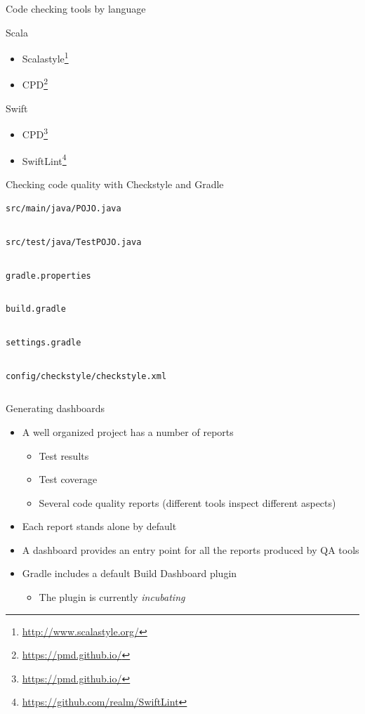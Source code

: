 \documentclass[presentation]{beamer}
\newcommand{\codefile}[4]{
	\begin{block}{\texttt{#2}}
		\inputminted[fontsize=#3,linenos=true,breaklines=true]{#4}{"workspace/#1/#2"}
	\end{block}
}
\newcommand{\java}[3]{\codefile{#1}{#2}{#3}{java}}
\newcommand{\groovy}[3]{\codefile{#1}{#2}{#3}{groovy}}
\newcommand{\tinier}{\fontsize{4pt}{5pt}\selectfont}
\newcommand{\fnurl}[1]{\footnote{\url{#1}}}
\begin{document}
\begin{frame}{Code checking tools by language}
    \begin{block}{Scala}
        \begin{itemize}
            \item Scalastyle\fnurl{http://www.scalastyle.org/}
            \item CPD\fnurl{https://pmd.github.io/}
        \end{itemize}
    \end{block}
    \begin{block}{Swift}
        \begin{itemize}
            \item CPD\fnurl{https://pmd.github.io/}
            \item SwiftLint\fnurl{https://github.com/realm/SwiftLint}
        \end{itemize}
    \end{block}
\end{frame}

\begin{frame}{Checking code quality with Checkstyle and Gradle}
    \java{20-Checkstyle}{src/main/java/POJO.java}{\tinier}
    \java{20-Checkstyle}{src/test/java/TestPOJO.java}{\tinier}
    \groovy{20-Checkstyle}{gradle.properties}{\scriptsize}
    \groovy{20-Checkstyle}{build.gradle}{\scriptsize}
    \groovy{20-Checkstyle}{settings.gradle}{\normalsize}
    \begin{block}{\texttt{config/checkstyle/checkstyle.xml}}
        \inputminted[fontsize=\tiny,linenos=true,breaklines=true,firstline=1,lastline=25]{xml}{workspace/20-Checkstyle/config/checkstyle/checkstyle.xml}
    \end{block}
\end{frame}

\begin{frame}[fragile]{Generating dashboards}
    \begin{itemize}
        \item A well organized project has a number of reports
        \begin{itemize}
            \item Test results
            \item Test coverage
            \item Several code quality reports (different tools inspect different aspects)
        \end{itemize}
        \item Each report stands alone by default
        \item A dashboard provides an entry point for all the reports produced by QA tools
        \item Gradle includes a default Build Dashboard plugin
        \begin{itemize}
            \item The plugin is currently \textit{incubating}
        \end{itemize}
    \end{itemize}
\end{frame}
\end{document}
